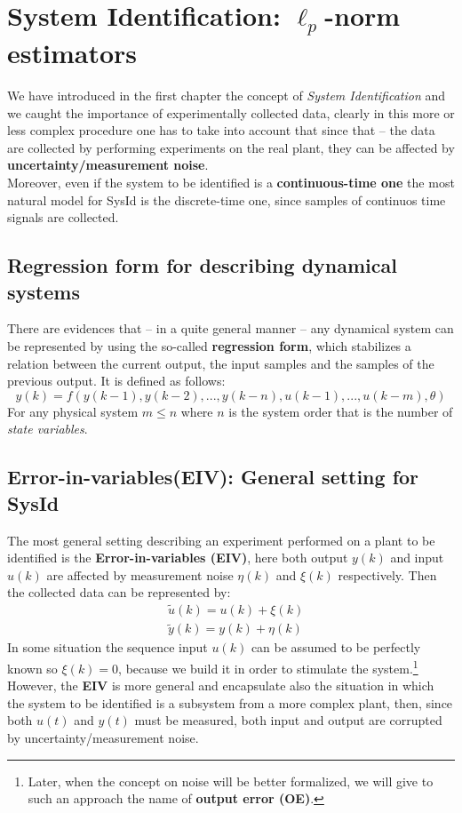 \chapter{System Identification: $\ell_p$-norm estimators}

We have introduced in the first chapter the concept of \textit{System Identification} and we caught the importance of experimentally collected data, clearly in this more or less complex procedure one has to take into account that since that -- the data are collected by performing experiments on the real plant, they can be affected by \textbf{uncertainty/measurement noise}.\\
Moreover, even if the system to be identified  is a \textbf{continuous-time one} the most natural model for SysId is the discrete-time one, since samples of continuos time signals are collected.

\section{Regression form for describing dynamical systems}
There are evidences that -- in a quite general manner -- any dynamical system can be represented by using the so-called \textbf{regression form}, which stabilizes a relation between the current output, the input samples and the samples of the previous output. It is defined as follows:
\begin{equation}    \label{eq:reg_form}
    y(k)=f(y(k-1), y(k-2),  ..., y(k-n), u(k-1), ..., u(k-m), \theta)
\end{equation}
For any physical system $m\le{n}$ where $n$ is the system order that is the number of \textit{state variables}.

\section{Error-in-variables(EIV): General setting for SysId}
The most general setting describing an experiment performed on a plant to be identified is the \textbf{Error-in-variables (EIV)}, here both output $y(k)$ and input $u(k)$ are affected by measurement noise $\eta(k)$ and $\xi(k)$ respectively. Then the collected data can be represented by:
\begin{align} 
    &\tilde{u}(k) = u(k) + \xi(k)\\
    &\tilde{y}(k) = y(k) + \eta(k)
\end{align} 
In some situation the sequence input $u(k)$ can be assumed to be perfectly known so $\xi(k)=0$, because we build it in order to stimulate the system.\footnote{
    Later, when the concept on noise will be better formalized, we will give to such an approach the name of \textbf{output error (OE)}.
}
However, the \textbf{EIV} is more general and encapsulate also the situation in which the system to be identified is a subsystem from a more complex plant, then, since both $u(t)$ and $y(t)$ must be measured, both input and output are corrupted  by uncertainty/measurement noise. 

